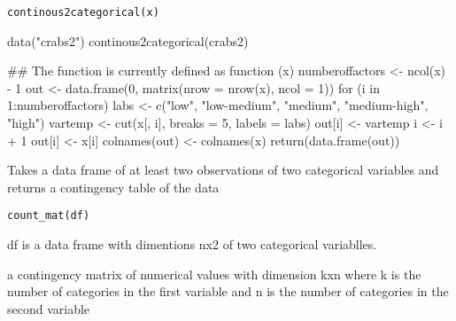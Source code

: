 \documentclass[letterpaper]{book}
\begin{document}
%
\begin{Usage}
\begin{verbatim}
continous2categorical(x)
\end{verbatim}
\end{Usage}
%
\begin{Arguments}
\begin{ldescription}
\item[\code{x}] 


\end{ldescription}
\end{Arguments}
%
\begin{Examples}
\begin{ExampleCode}

data("crabs2")
continous2categorical(crabs2)

## The function is currently defined as
function (x) 
{
    numberoffactors <- ncol(x) - 1
    out <- data.frame(0, matrix(nrow = nrow(x), ncol = 1))
    for (i in 1:numberoffactors) {
        labs <- c("low", "low-medium", "medium", "medium-high", 
            "high")
        vartemp <- cut(x[, i], breaks = 5, labels = labs)
        out[i] <- vartemp
    }
    i <- i + 1
    out[i] <- x[i]
    colnames(out) <- colnames(x)
    return(data.frame(out))
  }
\end{ExampleCode}
\end{Examples}
%
\begin{Description}\relax
Takes a data frame of at least two observations of two categorical variables 
and returns a contingency table of the data 
\end{Description}
%
\begin{Usage}
\begin{verbatim}
count_mat(df)
\end{verbatim}
\end{Usage}
%
\begin{Arguments}
\begin{ldescription}
\item[\code{df}] 
df is a data frame with dimentions nx2 of two categorical variablles. 

\end{ldescription}
\end{Arguments}
%
\begin{Value}
\begin{ldescription}
\item[\code{m}] a contingency matrix of numerical values with dimension kxn where k is the number of categories in the first variable and n is the number of categories in the second variable   
\end{ldescription}





\end{Value}
\end{document}
